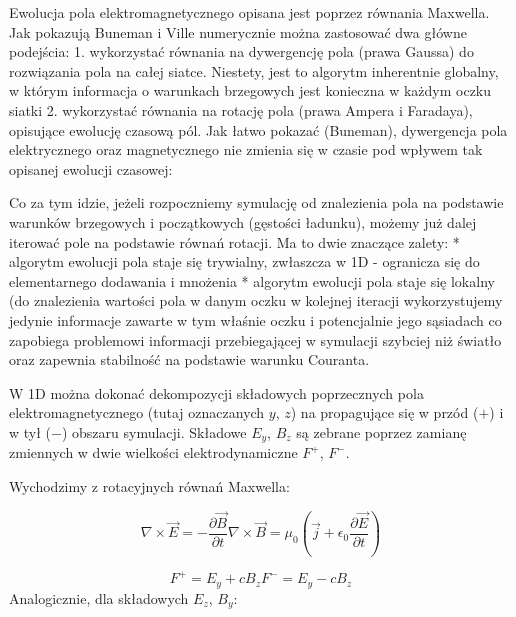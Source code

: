     Ewolucja pola elektromagnetycznego opisana jest poprzez równania Maxwella. Jak pokazują Buneman i Ville %
    numerycznie można zastosować dwa główne podejścia: %
    1. wykorzystać równania na dywergencję pola (prawa Gaussa) do rozwiązania pola na całej siatce. Niestety, jest to
    algorytm inherentnie globalny, w którym informacja o warunkach brzegowych jest konieczna w każdym oczku siatki
    2. wykorzystać równania na rotację pola (prawa Ampera i Faradaya), opisujące ewolucję czasową pól. Jak łatwo pokazać (Buneman),
    dywergencja pola elektrycznego oraz magnetycznego nie zmienia się w czasie pod wpływem tak opisanej ewolucji czasowej:

    Co za tym idzie, jeżeli rozpoczniemy symulację od znalezienia pola na podstawie warunków brzegowych i początkowych (gęstości
    ładunku), możemy już dalej iterować pole na podstawie równań rotacji. Ma to dwie znaczące zalety:
    * algorytm ewolucji pola staje się trywialny, zwłaszcza w 1D - ogranicza się do elementarnego dodawania i mnożenia %
    * algorytm ewolucji pola staje się lokalny (do znalezienia wartości pola w danym oczku w kolejnej iteracji wykorzystujemy
    jedynie informacje zawarte w tym właśnie oczku i potencjalnie jego sąsiadach %
    co zapobiega problemowi informacji przebiegającej w symulacji szybciej niż światło oraz zapewnia stabilność na podstawie
    warunku Couranta.

    W 1D można dokonać dekompozycji składowych poprzecznych pola elektromagnetycznego (tutaj oznaczanych $y$, $z$) na
    propagujące się w przód ($+$) i w tył ($-$) obszaru symulacji. Składowe $E_y$, $B_z$ są zebrane poprzez zamianę zmiennych
    w dwie wielkości elektrodynamiczne $F^+$, $F^-$.

    Wychodzimy z rotacyjnych równań Maxwella:

    \begin{equation}
        \nabla \times \vec{E} = -\frac{\partial \vec{B}}{\partial t}
        \nabla \times \vec{B} = \mu_0 (\vec{j} + \epsilon_0 \frac{\partial \vec{E}}{\partial t})
        \label{eqn:Maxwell-rotation-derivation}
    \end{equation}


    \begin{equation}
        F^{+} = E_y + c B_z
        F^{-} = E_y - c B_z
        \label{eqn:Birdsall-electromagnetic-quantities}
    \end{equation}
    Analogicznie, dla składowych $E_z$, $B_y$:

